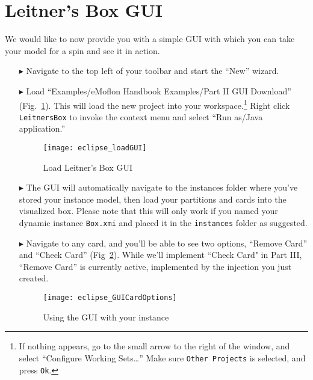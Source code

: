 \newpage
\section{Leitner's Box GUI}
\genHeader

We would like to now provide you with a simple GUI with which you can take your model for a spin and see it in action.

\begin{itemize}

\item[$\blacktriangleright$] Navigate to the top left of your toolbar and start the ``New'' wizard.

\item[$\blacktriangleright$] Load ``Examples/eMoflon Handbook Examples/Part II GUI Download'' (Fig.~\ref{fig:GUI_load}). This will load the new project
into your workspace.\footnote{If nothing appears, go to the small arrow to the right of the window, and select ``Configure Working Sets\ldots'' Make sure
\texttt{Other Projects} is selected, and press \texttt{Ok}.} Right click \texttt{LeitnersBox} to invoke the context menu and select ``Run as/Java application.''

\begin{figure}[htbp]
    \centering
    \texttt{[image: eclipse\_loadGUI]}
    \caption{Load Leitner's Box GUI}
    \label{fig:GUI_load}
\end{figure}

\clearpage

\item[$\blacktriangleright$] The GUI will automatically navigate to the instances folder where you've stored your instance model, then load your partitions and
cards into the visualized box. Please note that this will only work if you named your dynamic instance \texttt{Box.xmi} and placed it in the \texttt{instances}
folder as suggested.

\vspace{0.5cm}

\item[$\blacktriangleright$] Navigate to any card, and you'll be able to see two options, ``Remove Card'' and ``Check Card'' (Fig~\ref{fig:GUI_cardOptions}).
While we'll implement ``Check Card" in Part III, ``Remove Card'' is currently active, implemented by the injection you just created.

\vspace{1cm}

\begin{figure}[htbp]
    \centering
    \texttt{[image: eclipse\_GUICardOptions]}
    \caption{Using the GUI with your instance}
    \label{fig:GUI_cardOptions}
\end{figure}


\end{itemize}
